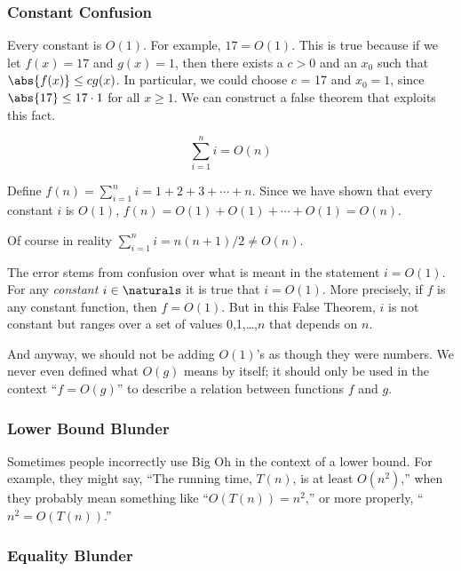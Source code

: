 \subsubsection{Constant Confusion}

Every constant is $O(1)$.  For example, $17 = O(1)$.  This is true because
if we let $f(x) = 17$ and $g(x) = 1$, then there exists a $c > 0$ and an
$x_0$ such that $\abs{f(x)} \leq c g(x)$.  In particular, we could choose
$c$ = 17 and $x_0 = 1$, since $\abs{17} \leq 17 \cdot 1$ for all $x \geq
1$.  We can construct a false theorem that exploits this fact.

\begin{falsethm}
\[
\sum_{i=1}^n i = O(n)
\]
\end{falsethm}

\begin{falseproof}
Define $f(n) = \sum_{i=1}^n i = 1 + 2 + 3 + \cdots + n$.  Since we
have shown that every constant $i$ is $O(1)$, $f(n) = O(1) + O(1) +
\cdots + O(1) = O(n)$.
\end{falseproof}

Of course in reality $\sum_{i=1}^n i = n(n+1)/2 \neq O(n)$.

The error stems from confusion over what is meant in the statement $i =
O(1)$.  For any \emph{constant} $i\in \naturals$ it is true that $i =
O(1)$.  More precisely, if $f$ is any constant function, then $f = O(1)$.
But in this False Theorem, $i$ is not constant but ranges over a set of
values 0,1,\dots,$n$ that depends on $n$.

And anyway, we should not be adding $O(1)$'s as though they were numbers.
We never even defined what $O(g)$ means by itself; it should only be used
in the context ``$f = O(g)$'' to describe a relation between functions $f$
and $g$.

\subsubsection{Lower Bound Blunder}

Sometimes people incorrectly use Big Oh in the context of a lower bound.
For example, they might say, ``The running time, $T(n)$, is at least
$O(n^2)$,'' when they probably mean something like ``$O(T(n)) = n^2$,'' or
more properly, ``$n^2 = O(T(n))$.''

\subsubsection{Equality Blunder}

